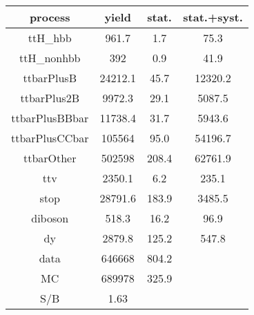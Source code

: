 \begin{tabular}{cccc}
\hline
    process     &  yield  &  stat.  &  stat.+syst.  \\
\hline
    ttH\_hbb     &  961.7  &   1.7   &     75.3      \\
   ttH\_nonhbb   &   392   &   0.9   &     41.9      \\
   ttbarPlusB   & 24212.1 &  45.7   &    12320.2    \\
  ttbarPlus2B   & 9972.3  &  29.1   &    5087.5     \\
 ttbarPlusBBbar & 11738.4 &  31.7   &    5943.6     \\
 ttbarPlusCCbar & 105564  &  95.0   &    54196.7    \\
   ttbarOther   & 502598  &  208.4  &    62761.9    \\
      ttv       & 2350.1  &   6.2   &     235.1     \\
      stop      & 28791.6 &  183.9  &    3485.5     \\
    diboson     &  518.3  &  16.2   &     96.9      \\
       dy       & 2879.8  &  125.2  &     547.8     \\
      data      & 646668  &  804.2  &               \\
       MC       & 689978  &  325.9  &               \\
      S/B       &  1.63   &         &               \\
\hline
\end{tabular}